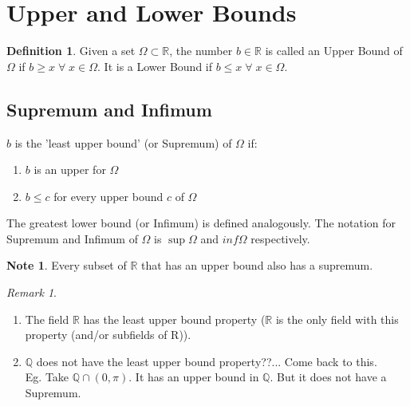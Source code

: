 \documentclass[a4paper, notitlepage]{report}
\theoremstyle{remark}
\newtheorem*{remark}{Remark}
\theoremstyle{definition}
\newtheorem{definition}{Definition}[section]
\newtheorem*{note}{Note}
\begin{document}
            \section{Upper and Lower Bounds}
	    \begin{definition}
	    Given a set $\Omega \subset \mathbb{R}$, the number $b\in \mathbb{R}$ is called an Upper Bound of $\Omega$ if $b\geq x \; \forall \; x \in \Omega$. It is a Lower Bound if $b\leq x \; \forall \; x \in \Omega$.
	    \end{definition}
            \subsection{Supremum and Infimum}
            $b$ is the 'least upper bound' (or Supremum) of $\Omega$ if:
            \begin{enumerate}
                \item $b$ is an upper for $\Omega$
                \item $b \leq c$ for every upper bound $c$ of $\Omega$
            \end{enumerate}
            The greatest lower bound (or Infimum) is defined analogously. The notation for Supremum and Infimum of $\Omega$ is $\sup\Omega$ and $inf\Omega$ respectively.
            \\ \begin{note}
            Every subset of $\mathbb{R}$ that has an upper bound also has a supremum.
            \end{note}             
	    \begin{remark}
	      \\
	    \begin{enumerate}
                \item The field $\mathbb{R}$ has the least upper bound property ($\mathbb{R}$ is the only field with this property (and/or subfields of R)).
                \item $\mathbb{Q}$ does not have the least upper bound property??... Come back to this. \\ Eg. Take $\mathbb{Q} \cap (0,\pi)$. It has an upper bound in $\mathbb{Q}$. But it does not have a Supremum.
	      \end{enumerate}
	    \end{remark} 
\end{document}
